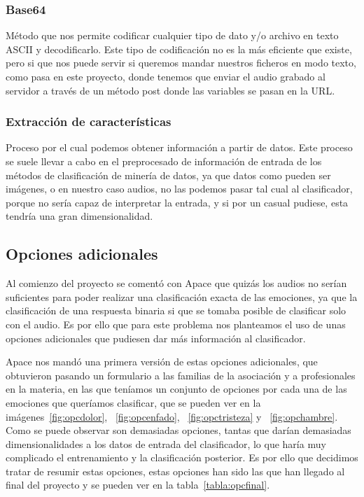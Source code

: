 \subsubsection{Base64}
Método que nos permite codificar cualquier tipo de dato y/o archivo en texto ASCII y decodificarlo. Este tipo de codificación no es la más eficiente que existe, pero si que nos puede servir si queremos mandar nuestros ficheros en modo texto, como pasa en este proyecto, donde tenemos que enviar el audio grabado al servidor a través de un método post donde las variables se pasan en la URL.
\subsubsection{Extracción de características}
Proceso por el cual podemos obtener información a partir de datos. Este proceso se suele llevar a cabo en el preprocesado de información de entrada de los métodos de clasificación de minería de datos, ya que datos como pueden ser imágenes, o en nuestro caso audios, no las podemos pasar tal cual al clasificador, porque no sería capaz de interpretar la entrada, y si por un casual pudiese, esta tendría una gran dimensionalidad.
\subsection{Opciones adicionales}
Al comienzo del proyecto se comentó con Apace que quizás los audios no serían suficientes para poder realizar una clasificación exacta de las emociones, ya que la clasificación de una respuesta binaria si que se tomaba posible de clasificar solo con el audio. Es por ello que para este problema nos planteamos el uso de unas opciones adicionales que pudiesen dar más información al clasificador.

Apace nos mandó una primera versión de estas opciones adicionales, que obtuvieron pasando un formulario a las familias de la asociación y a profesionales en la materia, en las que teníamos un conjunto de opciones por cada una de las emociones que queríamos clasificar, que se pueden ver en la imágenes~\ref{fig:opcdolor}, ~\ref{fig:opcenfado}, ~\ref{fig:opctristeza} y ~\ref{fig:opchambre}. Como se puede observar son demasiadas opciones, tantas que darían demasiadas dimensionalidades a los datos de entrada del clasificador, lo que haría muy complicado el entrenamiento y la clasificación posterior. Es por ello que decidimos tratar de resumir estas opciones, estas opciones han sido las que han llegado al final del proyecto y se pueden ver en la tabla~\ref{tabla:opcfinal}.


